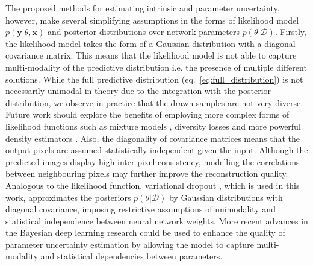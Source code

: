  The proposed methods for estimating intrinsic and parameter uncertainty, however, make several simplifying assumptions in the forms of likelihood model $p(\mathbf{y}|\theta, \mathbf{x})$ and posterior distributions over network parameters $p(\theta|\mathcal{D})$. Firstly, the likelihood model takes the form of a Gaussian distribution with a diagonal covariance matrix. This means that the likelihood model is not able to capture multi-modality of the predictive distribution i.e. the presence of multiple different solutions. While the full predictive distribution (eq.~\eqref{eq:full_distribution}) is not necessarily unimodal in theory due to the integration with the posterior distribution, we observe in practice that the drawn samples are not very diverse. Future work should explore the benefits of employing more complex forms of likelihood functions such as mixture models \cite{bishop1994mixture,kohl2018probabilistic}, diversity losses \cite{guzman2012multiple,bouchacourt2016disco,lee2018diverse} and more powerful density estimators \cite{huang2018multimodal,rezende2015variational,papamakarios2017masked,odena2017conditional,kohl2018probabilistic}. Also, the diagonality of covariance matrices means that the output pixels are assumed statistically independent given the input. Although the predicted images display high inter-pixel consistency, modelling the correlations between neighbouring pixels \cite{chandra2016fast} may further improve the reconstruction quality. Analogous to the likelihood function, variational dropout \cite{kingma2015variational}, which is used in this work, approximates the posteriors $p(\theta|\mathcal{D})$ by Gaussian distributions with diagonal covariance, imposing restrictive assumptions of unimodality and statistical independence between neural network weights. More recent advances in the Bayesian deep learning research \cite{louizos2016structured,oh2019radial,krueger2017bayesian,zhang2019cyclical,pawlowski2017implicit,louizos2017multiplicative} could be used to enhance the quality of parameter uncertainty estimation by allowing the model to capture multi-modality and statistical dependencies between parameters.  %

